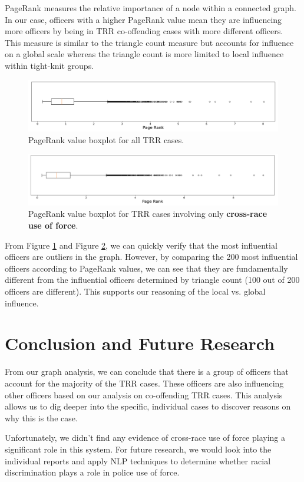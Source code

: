 \documentclass[10pt]{article}
\begin{document}
PageRank measures the relative importance of a node within a connected graph. In our case, officers with a higher PageRank value mean they are influencing more officers by being in TRR co-offending cases with more different officers. This measure is similar to the triangle count measure but accounts for influence on a global scale whereas the triangle count is more limited to local influence within tight-knit groups.

\begin{figure}[H]
\centering
\includegraphics[width=\textwidth]{pr}
\caption{PageRank value boxplot for all TRR cases.}
\label{pr}
\end{figure}

\begin{figure}[H]
\centering
\includegraphics[width=\textwidth]{pr_cross_race}
\caption{PageRank value boxplot for TRR cases involving only \textbf{cross-race use of force}.}
\label{pr_cross_race}
\end{figure}

From Figure \ref{pr} and Figure \ref{pr_cross_race}, we can quickly verify that the most influential officers are outliers in the graph. However, by comparing the 200 most influential officers according to PageRank values, we can see that they are fundamentally different from the influential officers determined by triangle count (100 out of 200 officers are different). This supports our reasoning of the local vs. global influence.


\section{Conclusion and Future Research}

From our graph analysis, we can conclude that there is a group of officers that account for the majority of the TRR cases. These officers are also influencing other officers based on our analysis on co-offending TRR cases. This analysis allows us to dig deeper into the specific, individual cases to discover reasons on why this is the case.

Unfortunately, we didn’t find any evidence of cross-race use of force playing a significant role in this system. For future research, we would look into the individual reports and apply NLP techniques to determine whether racial discrimination plays a role in police use of force.
\end{document}
